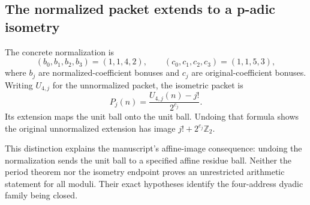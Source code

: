 \subsection{The normalized packet extends to a p-adic isometry}

The concrete normalization is
\[
 (b_0,b_1,b_2,b_3)=(1,1,4,2),\qquad
 (c_0,c_1,c_2,c_3)=(1,1,5,3),
\]
where $b_j$ are normalized-coefficient bonuses and $c_j$ are original-coefficient bonuses. Writing $U_{4,j}$ for the unnormalized packet, the isometric packet is
\[
 P_j(n)=\frac{U_{4,j}(n)-j!}{2^{c_j}}.
\]
Its extension maps the unit ball onto the unit ball. Undoing that formula shows the original unnormalized extension has image $j!+2^{c_j}\mathbb Z_2$.

This distinction explains the manuscript's affine-image consequence: undoing the normalization sends the unit ball to a specified affine residue ball. Neither the period theorem nor the isometry endpoint proves an unrestricted arithmetic statement for all moduli. Their exact hypotheses identify the four-address dyadic family being closed.
